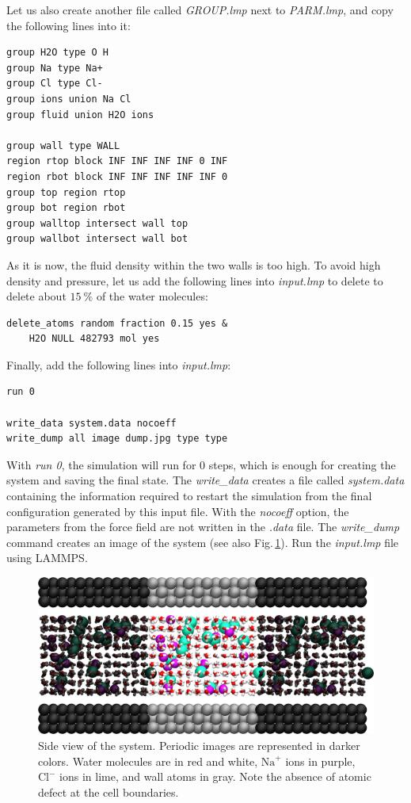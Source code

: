 \documentclass[9pt,tutorial]{livecoms}
\begin{document}
Let us also create another file called \textit{GROUP.lmp} next to
\textit{PARM.lmp}, and copy the following lines into it:
{\normalsize \begin{verbatim}
group H2O type O H
group Na type Na+
group Cl type Cl-
group ions union Na Cl
group fluid union H2O ions

group wall type WALL
region rtop block INF INF INF INF 0 INF
region rbot block INF INF INF INF INF 0
group top region rtop
group bot region rbot
group walltop intersect wall top
group wallbot intersect wall bot
\end{verbatim}}
As it is now, the fluid density within the two walls is too high. To avoid
high density and pressure, let us add the following lines into \textit{input.lmp}
to delete to delete about $15~\%$ of the water molecules:
{\normalsize \begin{verbatim}
delete_atoms random fraction 0.15 yes &
    H2O NULL 482793 mol yes
\end{verbatim}}
Finally, add the following lines into \textit{input.lmp}:
{\normalsize \begin{verbatim}
run 0

write_data system.data nocoeff
write_dump all image dump.jpg type type
\end{verbatim}}
With \textit{run 0}, the simulation will run for 0 steps, which is enough for
creating the system and saving the final state. The \textit{write\_data}
creates a file called \textit{system.data} containing the information required
to restart the simulation from the final configuration generated by this input
file. With the \textit{nocoeff} option, the parameters from the force field are
not written in the \textit{.data} file. The \textit{write\_dump} command creates
an image of the system (see also Fig.\,\ref{fig:NANOSHEAR-system}).
Run the \textit{input.lmp} file using LAMMPS.

\begin{figure}
\centering
\includegraphics[width=\linewidth]{NANOSHEAR-system}
\caption{Side view of the system. Periodic images are represented in darker colors.
Water molecules are in red and white, $\text{Na}^+$ ions in purple, $\text{Cl}^-$
ions in lime, and wall atoms in gray. Note the absence of atomic defect at the
cell boundaries.}
\label{fig:NANOSHEAR-system}
\end{figure}
\end{document}
